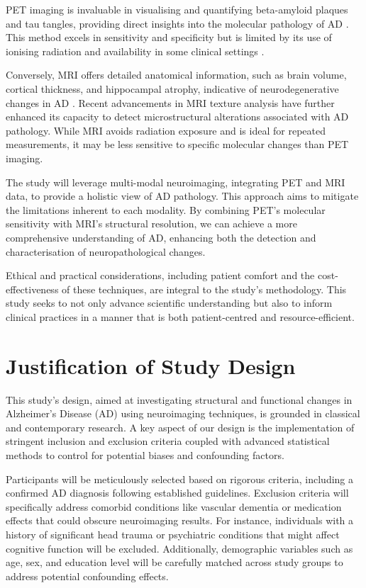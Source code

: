 \documentclass[10pt]{article}
\begin{document}
\begin{sloppypar}
  PET imaging is invaluable in visualising and quantifying beta-amyloid plaques and tau tangles, providing direct insights into the molecular pathology of AD \citep{jack_serial_2009}. This method excels in sensitivity and specificity but is limited by its use of ionising radiation and availability in some clinical settings \citep{bao_pet_2021}.

  Conversely, MRI offers detailed anatomical information, such as brain volume, cortical thickness, and hippocampal atrophy, indicative of neurodegenerative changes in AD \citep{cai_magnetic_2020}. Recent advancements in MRI texture analysis have further enhanced its capacity to detect microstructural alterations associated with AD pathology. While MRI avoids radiation exposure and is ideal for repeated measurements, it may be less sensitive to specific molecular changes than PET imaging.

  The study will leverage multi-modal neuroimaging, integrating PET and MRI data, to provide a holistic view of AD pathology. This approach aims to mitigate the limitations inherent to each modality. By combining PET’s molecular sensitivity with MRI’s structural resolution, we can achieve a more comprehensive understanding of AD, enhancing both the detection and characterisation of neuropathological changes.

  Ethical and practical considerations, including patient comfort and the cost-effectiveness of these techniques, are integral to the study’s methodology. This study seeks to not only advance scientific understanding but also to inform clinical practices in a manner that is both patient-centred and resource-efficient.

  \section{Justification of Study Design}
  \label{sec:justification-of-study-design}

  This study’s design, aimed at investigating structural and functional changes in Alzheimer’s Disease (AD) using neuroimaging techniques, is grounded in classical and contemporary research. A key aspect of our design is the implementation of stringent inclusion and exclusion criteria coupled with advanced statistical methods to control for potential biases and confounding factors.

  Participants will be meticulously selected based on rigorous criteria, including a confirmed AD diagnosis following established guidelines. Exclusion criteria will specifically address comorbid conditions like vascular dementia or medication effects that could obscure neuroimaging results. For instance, individuals with a history of significant head trauma or psychiatric conditions that might affect cognitive function will be excluded. Additionally, demographic variables such as age, sex, and education level will be carefully matched across study groups to address potential confounding effects.


\end{sloppypar}
\end{document}

